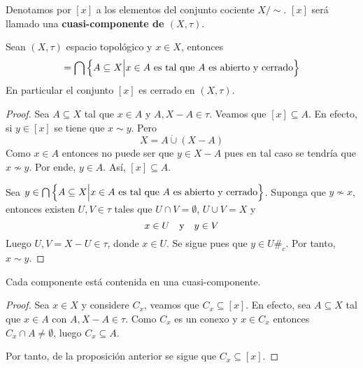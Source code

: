 \documentclass[12pt]{report}
\theoremstyle{largebreak}
\newcommand\contradiction{\ensuremath{\#_c}}
\begin{document}
    \begin{obs}
        Denotamos por $[x]$ a los elementos del conjunto cociente $X/\sim$. $[x]$ será llamado una \textbf{cuasi-componente de $(X,\tau)$}. 
    \end{obs}

    \begin{propo}
        Sean $(X,\tau)$ espacio topológico y $x\in X$, entonces
        \begin{equation*}
            [x]=\bigcap\left\{A\subseteq X\Big|x\in A\textup{ es tal que $A$ es abierto y cerrado}\right\}
        \end{equation*}
        En particular el conjunto $[x]$ es cerrado en $(X,\tau)$.
    \end{propo}

    \begin{proof}
        Sea $A\subseteq X$ tal que $x\in A$ y $A,X-A\in\tau$. Veamos que $[x]\subseteq A$. En efecto, si $y\in [x]$ se tiene que $x\sim y$. Pero
        \begin{equation*}
            X=A\dot{\cup}(X-A)
        \end{equation*}
        Como $x\in A$ entonces no puede ser que $y\in X-A$ pues en tal caso se tendría que $x\nsim y$. Por ende, $y\in A$. Así, $[x]\subseteq A$.

        Sea $y\in\bigcap\left\{A\subseteq X\Big|x\in A\textup{ es tal que $A$ es abierto y cerrado}\right\}$. Suponga que $y\nsim x$, entonces existen $U,V\in\tau$ tales que $U\cap V=\emptyset$, $U\cup V=X$ y
        \begin{equation*}
            x\in U\quad\textup{y}\quad y\in V
        \end{equation*}
        Luego $U,V=X-U\in\tau$, donde $x\in U$. Se sigue pues que $y\in U$\contradiction. Por tanto, $x\sim y$.
    \end{proof}

    \begin{propo}
        Cada componente está contenida en una cuasi-componente.
    \end{propo}

    \begin{proof}
        Sea $x\in X$ y considere $C_x$, veamos que $C_x\subseteq [x]$. En efecto, sea $A\subseteq X$ tal que $x\in A$ con $A,X-A\in\tau$. Como $C_x$ es un conexo y $x\in C_x$ entonces $C_x\cap A\neq\emptyset$, luego $C_x\subseteq A$.

        Por tanto, de la proposición anterior se sigue que $C_x\subseteq [x]$.
    \end{proof}
\end{document}
